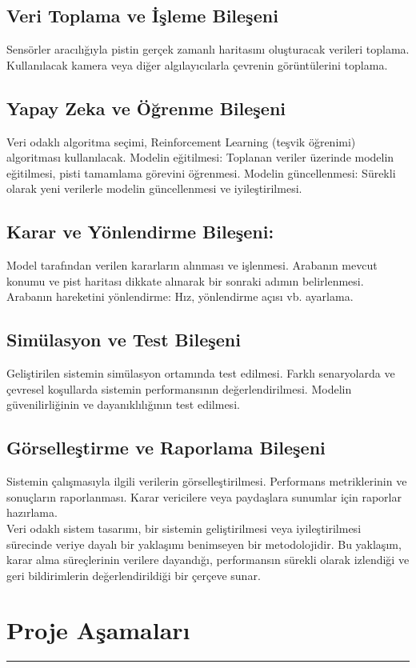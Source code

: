\documentclass{article}
\begin{document}
\subsection{Veri Toplama ve İşleme Bileşeni}
Sensörler aracılığıyla pistin gerçek zamanlı haritasını oluşturacak verileri toplama.
Kullanılacak kamera veya diğer algılayıcılarla çevrenin görüntülerini toplama.
\subsection{Yapay Zeka ve Öğrenme Bileşeni}
Veri odaklı algoritma seçimi, Reinforcement Learning (teşvik öğrenimi) algoritması kullanılacak.
Modelin eğitilmesi: Toplanan veriler üzerinde modelin eğitilmesi, pisti tamamlama görevini öğrenmesi.
Modelin güncellenmesi: Sürekli olarak yeni verilerle modelin güncellenmesi ve iyileştirilmesi.
\subsection{Karar ve Yönlendirme Bileşeni:}
Model tarafından verilen kararların alınması ve işlenmesi.
Arabanın mevcut konumu ve pist haritası dikkate alınarak bir sonraki adımın belirlenmesi.
Arabanın hareketini yönlendirme: Hız, yönlendirme açısı vb. ayarlama.
\subsection{Simülasyon ve Test Bileşeni}
Geliştirilen sistemin simülasyon ortamında test edilmesi.
Farklı senaryolarda ve çevresel koşullarda sistemin performansının değerlendirilmesi.
Modelin güvenilirliğinin ve dayanıklılığının test edilmesi.
\subsection{Görselleştirme ve Raporlama Bileşeni}
Sistemin çalışmasıyla ilgili verilerin görselleştirilmesi.
Performans metriklerinin ve sonuçların raporlanması.
Karar vericilere veya paydaşlara sunumlar için raporlar hazırlama.\\[15pt]

\noindent Veri odaklı sistem tasarımı, bir sistemin geliştirilmesi veya iyileştirilmesi sürecinde veriye dayalı bir yaklaşımı benimseyen bir metodolojidir. Bu yaklaşım, karar alma süreçlerinin verilere dayandığı, performansın sürekli olarak izlendiği ve geri bildirimlerin değerlendirildiği bir çerçeve sunar.

\newpage

\section{Proje Aşamaları}
\rule{\textwidth}{0.5pt}
\end{document}
